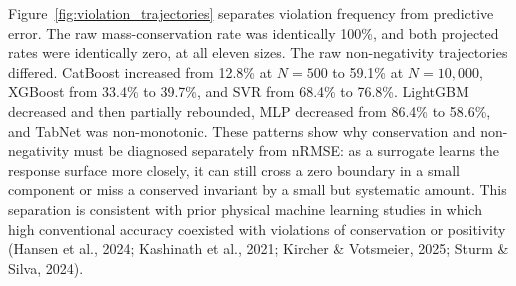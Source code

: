 \documentclass[a4paper,fleqn]{cas-sc}
\begin{document}
\FloatBarrier
\begin{table}[H]
\centering
\caption{Mass-conservation and non-negativity diagnostics at $N=10{,}000$. Raw rates and displacement are five-fold means. Every projected mass-conservation and non-negativity violation rate was zero.}
\label{tab:projection_physics}
\scriptsize
{}
\end{table}
\FloatBarrier

Figure~\ref{fig:violation_trajectories} separates violation frequency from predictive error. The raw mass-conservation rate was identically 100\%, and both projected rates were identically zero, at all eleven sizes. The raw non-negativity trajectories differed. CatBoost increased from 12.8\% at $N=500$ to 59.1\% at $N=10{,}000$, XGBoost from 33.4\% to 39.7\%, and SVR from 68.4\% to 76.8\%. LightGBM decreased and then partially rebounded, MLP decreased from 86.4\% to 58.6\%, and TabNet was non-monotonic. These patterns show why conservation and non-negativity must be diagnosed separately from nRMSE: as a surrogate learns the response surface more closely, it can still cross a zero boundary in a small component or miss a conserved invariant by a small but systematic amount. This separation is consistent with prior physical machine learning studies in which high conventional accuracy coexisted with violations of conservation or positivity (Hansen et al., 2024; Kashinath et al., 2021; Kircher \& Votsmeier, 2025; Sturm \& Silva, 2024).
\end{document}
